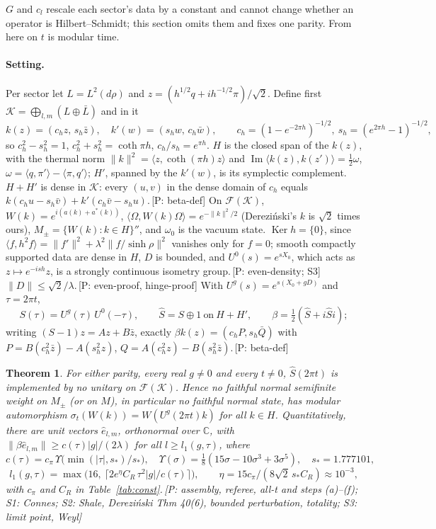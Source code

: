 \documentclass[11pt]{article}
\makeatletter
\newtheorem{theorem}{Theorem}
\newcommand{\cK}{\mathcal{K}}
\newcommand{\cF}{\mathcal{F}}
\newcommand{\ip}[2]{\langle #1,#2\rangle}
\newcommand{\ev}[1]{\,{\textsf{\scriptsize[#1]}}}
\renewcommand\section{\@startsection{section}{1}{\z@}{-2.4ex \@plus -1ex \@minus -.2ex}{1.2ex \@plus .2ex}{\normalfont\Large\bfseries}}
\makeatother
\begin{document}
\section{Non-implementability}\label{sec:shale}

$G$ and $c_l$ rescale each sector's data by a constant and cannot change whether an operator is Hilbert--Schmidt; this section omits them and fixes one parity. From here on $t$ is modular time.

\paragraph{Setting.} Per sector let $L=L^2(d\rho)$ and $z=(h^{1/2}q+ih^{-1/2}\pi)/\sqrt2$. Define first $\cK=\bigoplus_{l,m}(L\oplus\bar L)$ and in it
\[
k(z)=(c_hz,\,s_h\bar z),\quad k'(w)=(s_hw,\,c_h\bar w),\qquad c_h=(1-e^{-2\pi h})^{-1/2},\ s_h=(e^{2\pi h}-1)^{-1/2},
\]
so $c_h^2-s_h^2=1$, $c_h^2+s_h^2=\coth\pi h$, $c_h/s_h=e^{\pi h}$. $H$ is the closed span of the $k(z)$, with the thermal norm $\|k\|^2=\ip z{\coth(\pi h)z}$ and $\operatorname{Im}\ip{k(z)}{k(z')}=\frac12\omega$, $\omega=\ip q{\pi'}-\ip\pi{q'}$; $H'$, spanned by the $k'(w)$, is its symplectic complement. $H+H'$ is dense in $\cK$: every $(u,v)$ in the dense domain of $c_h$ equals $k(c_hu-s_h\bar v)+k'(c_h\bar v-s_hu)$.\ev{P: beta-def} On $\cF(\cK)$, $W(k)=e^{i(a(k)+a^*(k))}$, $\ip\Omega{W(k)\Omega}=e^{-\|k\|^2/2}$ (Dere\-zi\'nski's $k$ is $\sqrt2$ times ours), $M_\pm=\{W(k):k\in H\}''$, and $\omega_0$ is the vacuum state. $\operatorname{Ker}h=\{0\}$, since $\ip f{h^2f}=\|f'\|^2+\lambda^2\|f/\sinh\rho\|^2$ vanishes only for $f=0$; smooth compactly supported data are dense in $H$, $D$ is bounded, and $U^0(s)=e^{sX_0}$, which acts as $z\mapsto e^{-ish}z$, is a strongly continuous isometry group.\ev{P: even-density; S3} $\|D\|\le\sqrt2/\lambda$.\ev{P: even-proof, hinge-proof} With $U^g(s)=e^{s(X_0+gD)}$ and $\tau=2\pi t$,
\[
S(\tau)=U^g(\tau)\,U^0(-\tau),\qquad \hat S=S\oplus1\ \text{on}\ H+H',\qquad \beta=\tfrac12(\hat S+i\hat Si);
\]
writing $(S-1)z=Az+B\bar z$, exactly $\beta k(z)=(c_hP,s_h\bar Q)$ with $P=B(c_h^2\bar z)-A(s_h^2z)$, $Q=A(c_h^2z)-B(s_h^2\bar z)$.\ev{P: beta-def}

\begin{theorem}\label{thm:main}
For either parity, every real $g\neq0$ and every $t\neq0$, $\hat S(2\pi t)$ is implemented by no unitary on $\cF(\cK)$. Hence no faithful normal semifinite weight on $M_\pm$ (or on $M$), in particular no faithful normal state, has modular automorphism $\sigma_t(W(k))=W(U^g(2\pi t)k)$ for all $k\in H$. Quantitatively, there are unit vectors $\hat e_{l,m}$, orthonormal over $\mathbb C$, with $\|\beta\hat e_{l,m}\|\ge c(\tau)|g|/(2\lambda)$ for all $l\ge l_1(g,\tau)$, where
\[
c(\tau)=c_\pi\,\Upsilon\bigl(\min(|\tau|,s_*)/s_*\bigr),\quad \Upsilon(\sigma)=\tfrac18(15\sigma-10\sigma^3+3\sigma^5),\quad s_*=1.777101,
\]
\[
l_1(g,\tau)=\max\bigl(16,\ \lceil 2e^{\eta}C_R\,\tau^2|g|/c(\tau)\rceil\bigr),\qquad \eta=15c_\pi/(8\sqrt2\,s_*C_R)\approx10^{-3},
\]
with $c_\pi$ and $C_R$ in Table~\ref{tab:const}.\ev{P: assembly, referee, all-t and steps (a)--(f); S1: Connes; S2: Shale, Dere\-zi\'nski Thm 40(6), bounded perturbation, totality; S3: limit point, Weyl}
\end{theorem}
\end{document}
